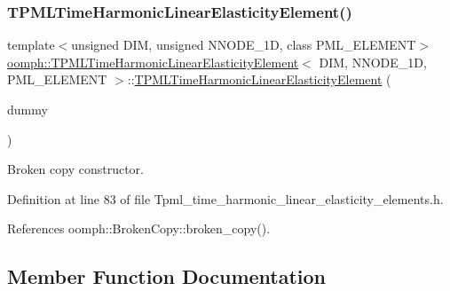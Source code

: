 \subsubsection{\texorpdfstring{T\+P\+M\+L\+Time\+Harmonic\+Linear\+Elasticity\+Element()}{TPMLTimeHarmonicLinearElasticityElement()}\hspace{0.1cm}{\footnotesize\ttfamily [2/2]}}
{\footnotesize\ttfamily template$<$unsigned D\+IM, unsigned N\+N\+O\+D\+E\+\_\+1D, class P\+M\+L\+\_\+\+E\+L\+E\+M\+E\+NT$>$ \\
\hyperlink{classoomph_1_1TPMLTimeHarmonicLinearElasticityElement}{oomph\+::\+T\+P\+M\+L\+Time\+Harmonic\+Linear\+Elasticity\+Element}$<$ D\+IM, N\+N\+O\+D\+E\+\_\+1D, P\+M\+L\+\_\+\+E\+L\+E\+M\+E\+NT $>$\+::\hyperlink{classoomph_1_1TPMLTimeHarmonicLinearElasticityElement}{T\+P\+M\+L\+Time\+Harmonic\+Linear\+Elasticity\+Element} (\begin{DoxyParamCaption}\item[{const \hyperlink{classoomph_1_1TPMLTimeHarmonicLinearElasticityElement}{T\+P\+M\+L\+Time\+Harmonic\+Linear\+Elasticity\+Element}$<$ D\+IM, N\+N\+O\+D\+E\+\_\+1D, P\+M\+L\+\_\+\+E\+L\+E\+M\+E\+NT $>$ \&}]{dummy }\end{DoxyParamCaption})\hspace{0.3cm}{\ttfamily [inline]}}



Broken copy constructor. 



Definition at line 83 of file Tpml\+\_\+time\+\_\+harmonic\+\_\+linear\+\_\+elasticity\+\_\+elements.\+h.



References oomph\+::\+Broken\+Copy\+::broken\+\_\+copy().



\subsection{Member Function Documentation}
\mbox{\label{classoomph_1_1TPMLTimeHarmonicLinearElasticityElement_a296d3643e117f2d2e0bc29b513922735}} 

